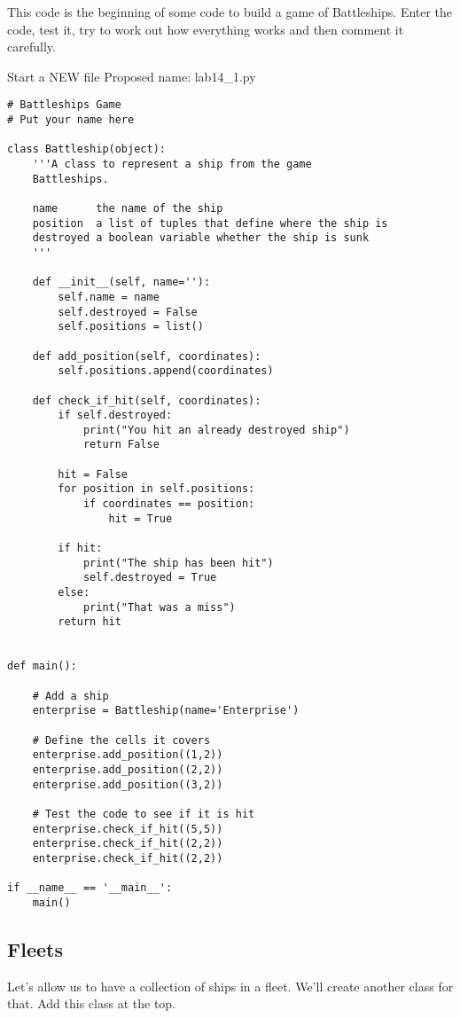 \documentclass[12pt,oneside]{cttutorial}
\begin{document}
This code is the beginning of some code to build a game of Battleships.
Enter the code, test it, try to work out how everything works and then
comment it carefully.


\alert{Start a NEW file}
Proposed name: lab14\_1.py
\begin{lstlisting}
# Battleships Game
# Put your name here

class Battleship(object):
    '''A class to represent a ship from the game
    Battleships.

    name      the name of the ship
    position  a list of tuples that define where the ship is
    destroyed a boolean variable whether the ship is sunk
    '''

    def __init__(self, name=''):
        self.name = name
        self.destroyed = False
        self.positions = list()

    def add_position(self, coordinates):
        self.positions.append(coordinates)

    def check_if_hit(self, coordinates):
        if self.destroyed:
            print("You hit an already destroyed ship")
            return False
        
        hit = False
        for position in self.positions:
            if coordinates == position:
                hit = True
                
        if hit:        
            print("The ship has been hit")
            self.destroyed = True
        else:
            print("That was a miss")
        return hit


def main():
    
    # Add a ship
    enterprise = Battleship(name='Enterprise')

    # Define the cells it covers
    enterprise.add_position((1,2))
    enterprise.add_position((2,2))
    enterprise.add_position((3,2))

    # Test the code to see if it is hit
    enterprise.check_if_hit((5,5))
    enterprise.check_if_hit((2,2))
    enterprise.check_if_hit((2,2))

if __name__ == '__main__':
    main()

\end{lstlisting}

\subsection{Fleets}

Let's allow us to have a collection of ships in a fleet. We'll create another
class for that. Add this class at the top.
\end{document}
